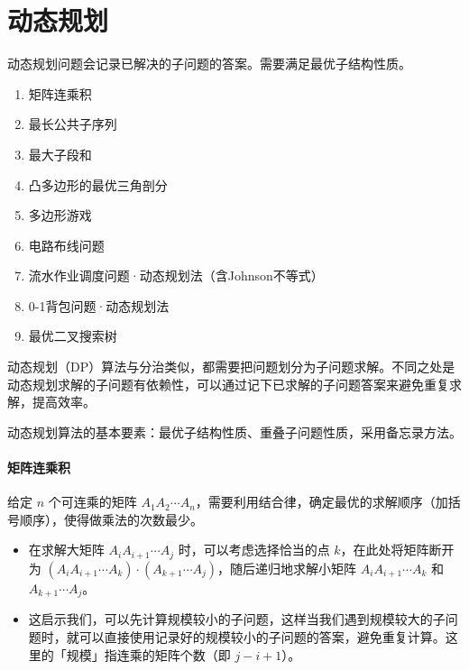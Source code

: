 \documentclass[UTF8]{ctexart}
\newcommand\Emph[1]{\textcolor{cyan!80!black}{#1}}
\begin{document}
\section{动态规划}
\begin{summary}
动态规划问题会记录已解决的子问题的答案。需要满足最优子结构性质。
\begin{enumerate}[itemsep=0pt,parsep=0pt]
  \item 矩阵连乘积
  \item \Emph{最长公共子序列}
  \item \Emph{最大子段和}
  \item 凸多边形的最优三角剖分
  \item \Emph{多边形游戏}
  \item 电路布线问题
  \item 流水作业调度问题·动态规划法（含Johnson不等式）
  \item \Emph{0-1背包问题·动态规划法}
  \item 最优二叉搜索树
\end{enumerate}
\end{summary}

动态规划（DP）算法与分治类似，都需要把问题划分为子问题求解。不同之处是动态规划求解的子问题有依赖性，可以通过记下已求解的子问题答案来避免重复求解，提高效率。

动态规划算法的基本要素：最优子结构性质、重叠子问题性质，采用备忘录方法。

\paragraph{矩阵连乘积} 给定 $n$ 个可连乘的矩阵 $A_1A_2\cdots A_n$，需要利用结合律，确定最优的求解顺序（加括号顺序），使得做乘法的次数最少。

\begin{itemize}
  \item 在求解大矩阵 $A_i A_{i+1}\cdots A_j$ 时，可以考虑选择恰当的点 $k$，在此处将矩阵断开为 $(A_i A_{i+1}\cdots A_k)\cdot (A_{k+1}\cdots A_j)$，随后递归地求解小矩阵 $A_i A_{i+1}\cdots A_k$ 和 $A_{k+1}\cdots A_j$。
  \item 这启示我们，可以先计算规模较小的子问题，这样当我们遇到规模较大的子问题时，就可以直接使用记录好的规模较小的子问题的答案，避免重复计算。这里的「规模」指连乘的矩阵个数（即 $j-i+1$）。
\end{itemize}
\end{document}
